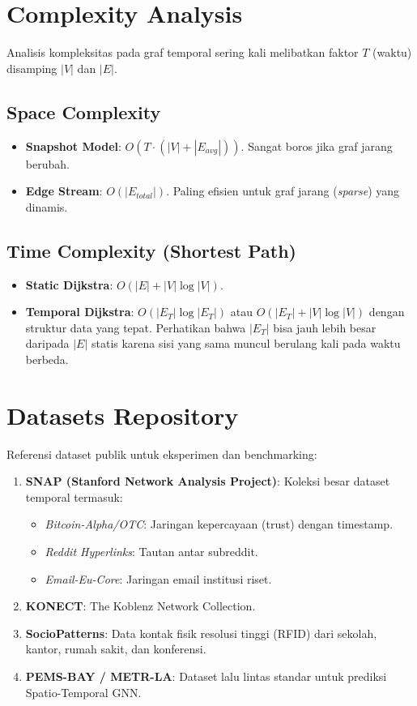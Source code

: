 \documentclass[12pt,a4paper]{book}
\begin{document}
\chapter{Complexity Analysis}
Analisis kompleksitas pada graf temporal sering kali melibatkan faktor $T$ (waktu) disamping $|V|$ dan $|E|$.
\section*{Space Complexity}
\begin{itemize}
    \item \textbf{Snapshot Model}: $O(T \cdot (|V| + |E_{avg}|))$. Sangat boros jika graf jarang berubah.
    \item \textbf{Edge Stream}: $O(|E_{total}|)$. Paling efisien untuk graf jarang (\textit{sparse}) yang dinamis.
\end{itemize}

\section*{Time Complexity (Shortest Path)}
\begin{itemize}
    \item \textbf{Static Dijkstra}: $O(|E| + |V|\log|V|)$.
    \item \textbf{Temporal Dijkstra}: $O(|E_T| \log |E_T|)$ atau $O(|E_T| + |V|\log|V|)$ dengan struktur data yang tepat. Perhatikan bahwa $|E_T|$ bisa jauh lebih besar daripada $|E|$ statis karena sisi yang sama muncul berulang kali pada waktu berbeda.
\end{itemize}

\chapter{Datasets Repository}
Referensi dataset publik untuk eksperimen dan benchmarking:
\begin{enumerate}
    \item \textbf{SNAP (Stanford Network Analysis Project)}: Koleksi besar dataset temporal termasuk:
    \begin{itemize}
        \item \textit{Bitcoin-Alpha/OTC}: Jaringan kepercayaan (trust) dengan timestamp.
        \item \textit{Reddit Hyperlinks}: Tautan antar subreddit.
        \item \textit{Email-Eu-Core}: Jaringan email institusi riset.
    \end{itemize}
    \item \textbf{KONECT}: The Koblenz Network Collection.
    \item \textbf{SocioPatterns}: Data kontak fisik resolusi tinggi (RFID) dari sekolah, kantor, rumah sakit, dan konferensi.
    \item \textbf{PEMS-BAY / METR-LA}: Dataset lalu lintas standar untuk prediksi Spatio-Temporal GNN.
\end{enumerate}
\end{document}
